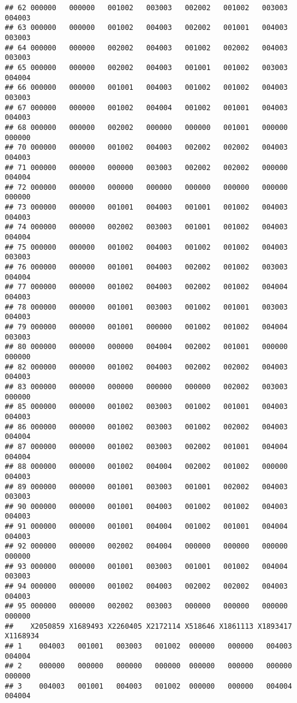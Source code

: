 \documentclass[
]{article}
\begin{document}
\begin{verbatim}
## 62 000000   000000   001002   003003   002002   001002   003003  004003
## 63 000000   000000   001002   004003   002002   001001   004003  003003
## 64 000000   000000   002002   004003   001002   002002   004003  003003
## 65 000000   000000   002002   004003   001001   001002   003003  004004
## 66 000000   000000   001001   004003   001002   001002   004003  003003
## 67 000000   000000   001002   004004   001002   001001   004003  004003
## 68 000000   000000   002002   000000   000000   001001   000000  000000
## 70 000000   000000   001002   004003   002002   002002   004003  004003
## 71 000000   000000   000000   003003   002002   002002   000000  004004
## 72 000000   000000   000000   000000   000000   000000   000000  000000
## 73 000000   000000   001001   004003   001001   001002   004003  004003
## 74 000000   000000   002002   003003   001001   001002   004003  004004
## 75 000000   000000   001002   004003   001002   001002   004003  003003
## 76 000000   000000   001001   004003   002002   001002   003003  004004
## 77 000000   000000   001002   004003   002002   001002   004004  004003
## 78 000000   000000   001001   003003   001002   001001   003003  004003
## 79 000000   000000   001001   000000   001002   001002   004004  003003
## 80 000000   000000   000000   004004   002002   001001   000000  000000
## 82 000000   000000   001002   004003   002002   002002   004003  004003
## 83 000000   000000   000000   000000   000000   002002   003003  000000
## 85 000000   000000   001002   003003   001002   001001   004003  004003
## 86 000000   000000   001002   003003   001002   002002   004003  004004
## 87 000000   000000   001002   003003   002002   001001   004004  004004
## 88 000000   000000   001002   004004   002002   001002   000000  004003
## 89 000000   000000   001001   003003   001001   002002   004003  003003
## 90 000000   000000   001001   004003   001002   001002   004003  004003
## 91 000000   000000   001001   004004   001002   001001   004004  004003
## 92 000000   000000   002002   004004   000000   000000   000000  000000
## 93 000000   000000   001001   003003   001001   001002   004004  003003
## 94 000000   000000   001002   004003   002002   002002   004003  004003
## 95 000000   000000   002002   003003   000000   000000   000000  000000
##    X2050859 X1689493 X2260405 X2172114 X518646 X1861113 X1893417 X1168934
## 1    004003   001001   003003   001002  000000   000000   004003   004004
## 2    000000   000000   000000   000000  000000   000000   000000   000000
## 3    004003   001001   004003   001002  000000   000000   004004   004004

\end{verbatim}
\end{document}

